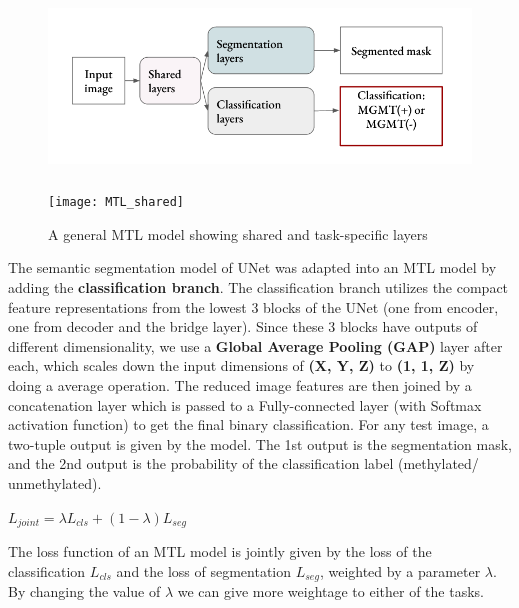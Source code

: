 \begin{figure}[H]
  \begin{center}
    \leavevmode
    \ifpdf
      \includegraphics[height=2.1in]{Experimental/Chapter2Figs/MTL_shared.png}
    \else
      \texttt{[image: MTL\_shared]}
    \fi
    \caption{A general MTL model showing shared and task-specific layers}
    \label{MTL_shared}
  \end{center}
\end{figure}

The semantic segmentation model of UNet was adapted into an MTL model by adding the \textbf{classification branch}. The classification branch utilizes the compact feature representations from the lowest 3 blocks of the UNet (one from encoder, one from decoder and the bridge layer). Since these 3 blocks have outputs of different dimensionality, we use a \textbf{Global Average Pooling (GAP)} layer after each, which scales down the input dimensions of \textbf{(X, Y, Z)} to \textbf{(1, 1, Z)} by doing a average operation. The reduced image features are then joined by a concatenation layer which is passed to a Fully-connected layer (with Softmax activation function) to get the final binary classification. For any test image, a two-tuple output is given by the model. The 1st output is the segmentation mask, and the 2nd output is the probability of the classification label (methylated/ unmethylated). 
\begin{center}
    $L_{joint} = \lambda L_{cls} + (1-\lambda) L_{seg}$
\end{center}
The loss function of an MTL model is jointly given by the loss of the classification $L_{cls}$ and the loss of segmentation $L_{seg}$, weighted by a parameter $\lambda$. By changing the value of $\lambda$ we can give more weightage to either of the tasks.
\vspace*{4mm}

